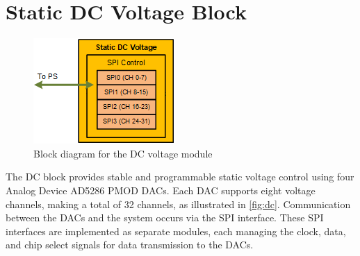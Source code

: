 

 

\section{Static DC Voltage Block}
\begin{figure}[h]
    \centering
    \includegraphics[width=0.5\linewidth]{figures/5.2.png}
    \caption{Block diagram for the DC voltage module}
    \label{fig:dc}
\end{figure}
The DC block provides stable and programmable static voltage control using four Analog Device AD5286 PMOD DACs. Each DAC supports eight voltage channels, making a total of 32 channels, as illustrated in \autoref{fig:dc}. Communication between the DACs and the system occurs via the SPI interface. These SPI interfaces are implemented as separate modules, each managing the clock, data, and chip select signals for data transmission to the DACs.

